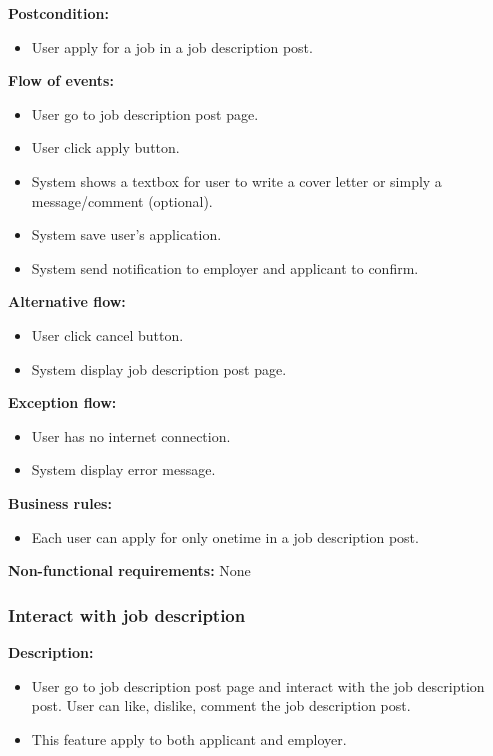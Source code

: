 \documentclass[a4paper]{article}
\begin{document}
        \textbf{Postcondition:}
        \begin{itemize}
            \item User apply for a job in a job description post.
        \end{itemize}

        \textbf{Flow of events:}
        \begin{itemize}
            \item User go to job description post page.
            \item User click apply button.
            \item System shows a textbox for user to write a cover letter or simply a message/comment (optional).
            \item System save user's application.
            \item System send notification to employer and applicant to confirm.
        \end{itemize}

        \textbf{Alternative flow:}
        \begin{itemize}
            \item User click cancel button.
            \item System display job description post page.
        \end{itemize}

        \textbf{Exception flow:}
        \begin{itemize}
            \item User has no internet connection.
            \item System display error message.
        \end{itemize}

        \textbf{Business rules:}
        \begin{itemize}
            \item Each user can apply for only onetime in a job description post.
        \end{itemize}

        \textbf{Non-functional requirements:}
        None

        \subsubsection{Interact with job description}
        \textbf{Description:}
        \begin{itemize}
            \item User go to job description post page and interact with the job description post. User can like, dislike, comment the job description post.
            \item This feature apply to both applicant and employer.
        \end{itemize}
\end{document}
